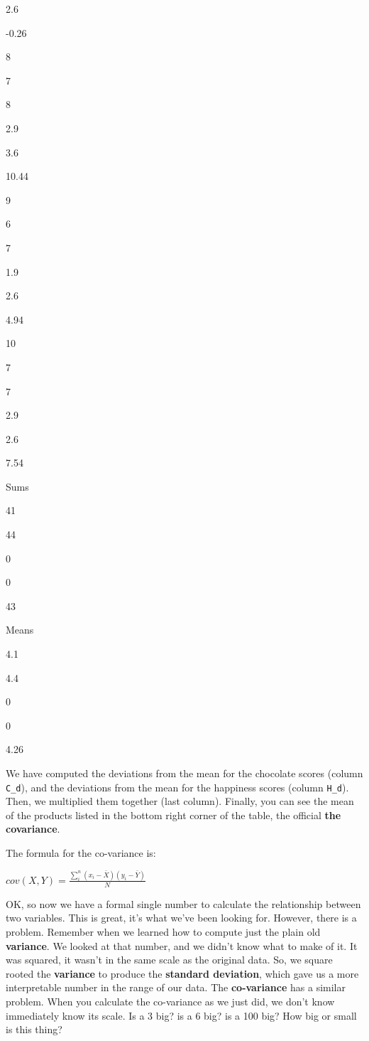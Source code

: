 \documentclass[]{book}
\begin{document}
2.6

-0.26

8

7

8

2.9

3.6

10.44

9

6

7

1.9

2.6

4.94

10

7

7

2.9

2.6

7.54

Sums

41

44

0

0

43

Means

4.1

4.4

0

0

4.26

We have computed the deviations from the mean for the chocolate scores (column \texttt{C\_d}), and the deviations from the mean for the happiness scores (column \texttt{H\_d}). Then, we multiplied them together (last column). Finally, you can see the mean of the products listed in the bottom right corner of the table, the official \textbf{the covariance}.

The formula for the co-variance is:

\(cov(X,Y) = \frac{\sum_{i}^{n}(x_{i}-\bar{X})(y_{i}-\bar{Y})}{N}\)

OK, so now we have a formal single number to calculate the relationship between two variables. This is great, it's what we've been looking for. However, there is a problem. Remember when we learned how to compute just the plain old \textbf{variance}. We looked at that number, and we didn't know what to make of it. It was squared, it wasn't in the same scale as the original data. So, we square rooted the \textbf{variance} to produce the \textbf{standard deviation}, which gave us a more interpretable number in the range of our data. The \textbf{co-variance} has a similar problem. When you calculate the co-variance as we just did, we don't know immediately know its scale. Is a 3 big? is a 6 big? is a 100 big? How big or small is this thing?
\end{document}
